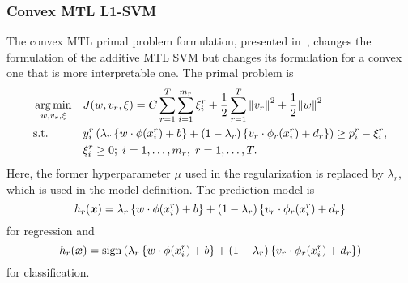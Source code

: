 \subsubsection{{Convex} MTL L1-SVM}
The {convex} MTL primal problem formulation, presented in~\cite{RuizAD19}, changes the formulation of the {additive} MTL SVM but changes its formulation for a convex one that is more interpretable one. The primal problem is
\begin{equation}\label{eq:svmmtl_primal_convex}
    \begin{aligned}
    & \argmin_{w, {v}_r, \xi}
    & & {J({w}, {v}_r, \xi) = C \sum_{r= 1}^T \sum_{i=1}^{m_r} {\xi_{i}^r} + \frac{1}{2} \sum_{r= 1}^T{\norm{{v}_r}^2} + \frac{1}{2} {\norm{{w}}}^2} \\
    & \text{s.t.}
    & & y_{i}^r \left(\lambda_r \left\lbrace {w} \cdot \phi(x_{i}^r) + b  \right\rbrace + (1 - \lambda_r) \left\lbrace {v}_r \cdot \phi_r(x_{i}^r) + d_r \right\rbrace  \right) \geq p_{i}^r - \xi_{i}^r ,  \\
    & & & \xi_{i}^r \geq 0; \;  i=1 , \dotsc , m_r, \;  r= 1,\dotsc, T  . \\
    \end{aligned}
\end{equation}
Here, the former hyperparameter $\mu$ used in the regularization is replaced by $\lambda_r$, which is used in the model definition. The prediction model is
\begin{equation}
    \nonumber
    h_r(\bm{x}) = \lambda_r \left\lbrace {w} \cdot \phi(x_{i}^r) + b  \right\rbrace + (1 - \lambda_r) \left\lbrace {v}_r \cdot \phi_r(x_{i}^r) + d_r \right\rbrace
\end{equation}
for regression and 
\begin{equation}
    \nonumber
    h_r(\bm{x}) = \operatorname{sign}{ \left(\lambda_r \left\lbrace {w} \cdot \phi(x_{i}^r) + b  \right\rbrace + (1 - \lambda_r) \left\lbrace {v}_r \cdot \phi_r(x_{i}^r) + d_r \right\rbrace \right)}
\end{equation}
for classification.
%


